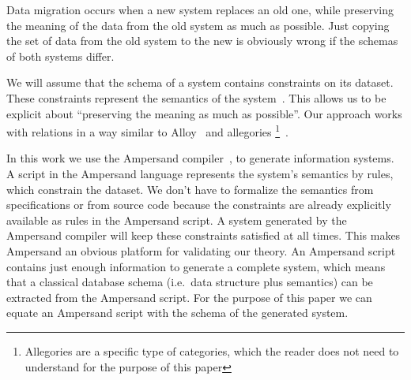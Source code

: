 \documentclass{elsarticle}
\begin{document}
   Data migration occurs when a new system replaces an old one,
   while preserving the meaning of the data from the old system as much as possible.
   Just copying the set of data from the old system to the new is obviously wrong if the schemas of both systems differ.

   We will assume that the schema of a system contains constraints on its dataset.
   These constraints represent the semantics of the system~\cite{Spivak2012}.
   This allows us to be explicit about ``preserving the meaning as much as possible''.
   Our approach works with relations in a way similar to Alloy~\cite{Alloy2006} and allegories%
\footnote{Allegories are a specific type of categories, which the reader does not need to understand for the purpose of this paper}~\cite{Zielinski2013}.

   In this work we use the Ampersand compiler~\cite{Joosten-JLAMP2018},
   to generate information systems.
   A script in the Ampersand language represents the system's semantics by rules,
   which constrain the dataset.
   We don't have to formalize the semantics from specifications or from source code
   because the constraints are already explicitly available as rules in the Ampersand script.
   A system generated by the Ampersand compiler will keep these constraints satisfied at all times.
   This makes Ampersand an obvious platform for validating our theory.
   An Ampersand script contains just enough information to generate a complete system,
   which means that a classical database schema (i.e.\ data structure plus semantics) can be extracted from the Ampersand script.
   For the purpose of this paper we can equate an Ampersand script with the schema of the generated system.
\end{document}
